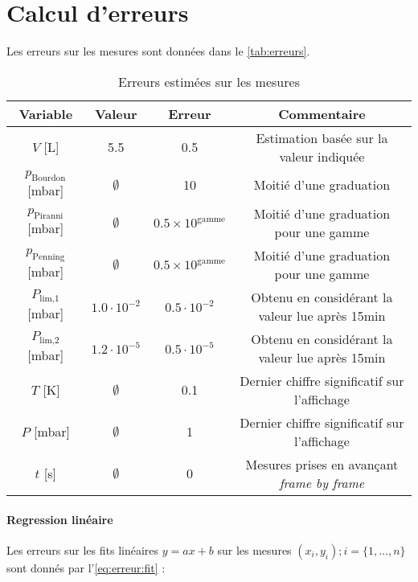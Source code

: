 \section{Calcul d'erreurs}

Les erreurs sur les mesures sont données dans le \autoref{tab:erreurs}.

\begin{table}[h]
    \centering
    \begin{tabulary}{\textwidth}{C C C C}
        \toprule
        Variable & Valeur & Erreur & Commentaire \\
        \midrule
        \(V\) [\si{\liter}] & 5.5 & 0.5 & Estimation basée sur la valeur indiquée \\
        \(p_\textrm{Bourdon}\) [\si{\milli\bar}] & \(\emptyset\) & 10 & Moitié d'une graduation \\
        \(p_\textrm{Piranni}\) [\si{\milli\bar}] & \(\emptyset\) & \(0.5 \times 10^\textrm{gamme}\) & Moitié d'une graduation pour une gamme \\
        \(p_\textrm{Penning}\) [\si{\milli\bar}] & \(\emptyset\) & \(0.5 \times 10^\textrm{gamme}\) & Moitié d'une graduation pour une gamme \\
        \(P_\textrm{lim,1}\) [\si{\milli\bar}] & \(1.0 \cdot 10^{-2}\) & \(0.5 \cdot 10^{-2}\) & Obtenu en considérant la valeur lue après 15min \\
        \(P_\textrm{lim,2}\) [\si{\milli\bar}] & \(1.2 \cdot 10^{-5}\) & \(0.5 \cdot 10^{-5}\) & Obtenu en considérant la valeur lue après 15min \\
        \midrule
        \(T\) [\si{\kelvin}] & \(\emptyset\) & 0.1 & Dernier chiffre significatif sur l'affichage \\
        \(P\) [\si{\milli\bar}] & \(\emptyset\) & 1 & Dernier chiffre significatif sur l'affichage \\
        \(t\) [\si{\second}] & \(\emptyset\) & 0 & Mesures prises en avançant \textit{frame by frame} \\
        \bottomrule
    \end{tabulary}
    \caption{Erreurs estimées sur les mesures}
    \label{tab:erreurs}
\end{table}

\paragraph*{Regression linéaire}
Les erreurs sur les fits linéaires \(y = ax + b\) sur les mesures \((x_i, y_i) ; i = \{1, \hdots, n\}\) sont donnés par l'\autoref{eq:erreur:fit} \cite{erreursmesure}:

